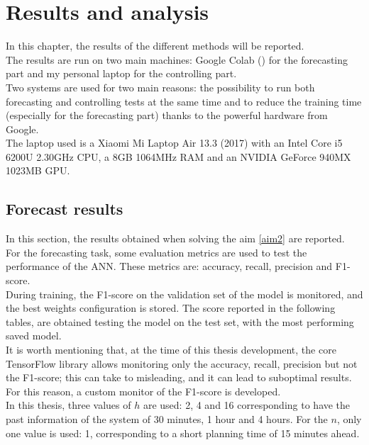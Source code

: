 \chapter{Results and analysis}
\label{ch5}
In this chapter, the results of the different methods will be reported. \\

\noindent The results are run on two main machines: Google Colab (\cite{gcolab}) for the forecasting part and my personal laptop for the controlling part.\\
Two systems are used for two main reasons: the possibility to run both forecasting and controlling tests at the same time and to reduce the training time (especially for the forecasting part) thanks to the powerful hardware from Google.\\
The laptop used is a Xiaomi Mi Laptop Air 13.3 (2017) with an Intel Core i5 6200U 2.30GHz CPU, a 8GB 1064MHz RAM and an NVIDIA GeForce 940MX 1023MB GPU.

\section{Forecast results}
\label{sec:5fr}
In this section, the results obtained when solving the aim \ref{aim2} are reported.\\

For the forecasting task, some evaluation metrics are used to test the performance of the \gls{ANN}. These metrics are: accuracy, recall, precision and F1-score. \\
During training, the F1-score on the validation set of the model is monitored, and the best weights configuration is stored. The score reported in the following tables, are obtained testing the model on the test set, with the most performing saved model. \\
It is worth mentioning that, at the time of this thesis development, the core TensorFlow library allows monitoring only the accuracy, recall, precision but not the F1-score; this can take to misleading, and it can lead to suboptimal results. For this reason, a custom monitor of the F1-score is developed.\\

In this thesis, three values of $h$ are used: 2, 4 and 16 corresponding to have the past information of the system of 30 minutes, 1 hour and 4 hours. For the $n$, only one value is used: 1, corresponding to a short planning time of 15 minutes ahead.\\

